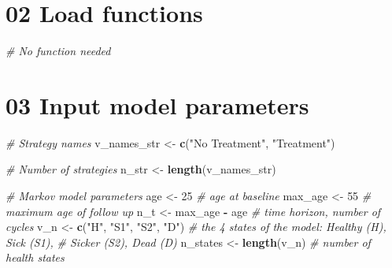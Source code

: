 \documentclass[]{article}
\newenvironment{Shaded}{\begin{snugshade}}{\end{snugshade}}
\newcommand{\KeywordTok}[1]{\textcolor[rgb]{0.13,0.29,0.53}{\textbf{#1}}}
\newcommand{\DecValTok}[1]{\textcolor[rgb]{0.00,0.00,0.81}{#1}}
\newcommand{\StringTok}[1]{\textcolor[rgb]{0.31,0.60,0.02}{#1}}
\newcommand{\CommentTok}[1]{\textcolor[rgb]{0.56,0.35,0.01}{\textit{#1}}}
\newcommand{\OperatorTok}[1]{\textcolor[rgb]{0.81,0.36,0.00}{\textbf{#1}}}
\newcommand{\NormalTok}[1]{#1}
\begin{document}
\section{02 Load functions}\label{load-functions}

\begin{Shaded}
\begin{Highlighting}[]
\CommentTok{# No function needed}
\end{Highlighting}
\end{Shaded}

\section{03 Input model parameters}\label{input-model-parameters}

\begin{Shaded}
\begin{Highlighting}[]
\CommentTok{# Strategy names}
\NormalTok{v_names_str <-}\StringTok{ }\KeywordTok{c}\NormalTok{(}\StringTok{"No Treatment"}\NormalTok{, }\StringTok{"Treatment"}\NormalTok{) }

\CommentTok{# Number of strategies}
\NormalTok{n_str <-}\StringTok{ }\KeywordTok{length}\NormalTok{(v_names_str)}

\CommentTok{# Markov model parameters}
\NormalTok{age     <-}\StringTok{ }\DecValTok{25}                       \CommentTok{# age at baseline}
\NormalTok{max_age <-}\StringTok{ }\DecValTok{55}                       \CommentTok{# maximum age of follow up}
\NormalTok{n_t     <-}\StringTok{ }\NormalTok{max_age }\OperatorTok{-}\StringTok{ }\NormalTok{age            }\CommentTok{# time horizon, number of cycles}
\NormalTok{v_n     <-}\StringTok{ }\KeywordTok{c}\NormalTok{(}\StringTok{"H"}\NormalTok{, }\StringTok{"S1"}\NormalTok{, }\StringTok{"S2"}\NormalTok{, }\StringTok{"D"}\NormalTok{)  }\CommentTok{# the 4 states of the model: Healthy (H), Sick (S1), }
                                    \CommentTok{# Sicker (S2), Dead (D)}
\NormalTok{n_states <-}\StringTok{ }\KeywordTok{length}\NormalTok{(v_n)             }\CommentTok{# number of health states }


\end{Highlighting}
\end{Shaded}
\end{document}
